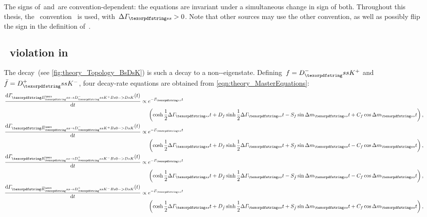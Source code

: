 The signs of~\Dpar and~\DG are convention-dependent: the equations are invariant under a simultaneous change in sign of both.
Throughout this thesis, the \hflav~convention~\cite{HFLAV2016} is used, with~\({\DGs > 0}\).
Note that other sources may use the other convention, as well as possibly flip the sign in the definition of~\Spar.

\subsection{\CP~violation in~\BsDsK}
\label{sec:CPV}

The decay~\BsDsK (see \cref{fig:theory_Topology_BsDsK}) is such a decay to a non-\CP-eigenstate. Defining~\({\f = \DsmKp}\) and~\({\fb = \DspKm}\), four decay-rate equations are obtained from \cref{eqn:theory_MasterEquations}:
%
\begin{subequations} \label{eqn:theory_MasterEquationsDsK}
    \begin{align}
        \begin{split}
            \dfrac{\deriv\Gamma_{\BsDsmKp}(t)} {\deriv t} \propto{} & e^{-\Gs t} \\
                & \left(\cosh \frac{1}{2} \DGs t + \Dpar \sinh \frac{1}{2} \DGs t - \Spar \sin \dms t + \Cpar \cos \dms t \right) \rlap{,}
        \end{split} \\
        \begin{split}
            \dfrac{\deriv\Gamma_{\BsbDsmKp}(t)}{\deriv t} \propto{} & e^{-\Gs t} \\
                & \left(\cosh \frac{1}{2} \DGs t + \Dpar \sinh \frac{1}{2} \DGs t + \Spar \sin \dms t - \Cpar \cos \dms t \right) \rlap{,}
        \end{split} \\
        \begin{split}
            \dfrac{\deriv\Gamma_{\BsDspKm}(t)} {\deriv t} \propto{} & e^{-\Gs t} \\
                & \left(\cosh \frac{1}{2} \DGs t + \Dbpar \sinh \frac{1}{2} \DGs t - \Sbpar \sin \dms t - \Cpar \cos \dms t \right) \rlap{,}
        \end{split} \\
        \begin{split}
            \dfrac{\deriv\Gamma_{\BsbDspKm}(t)}{\deriv t} \propto{} & e^{-\Gs t} \\
                & \left(\cosh \frac{1}{2} \DGs t + \Dbpar \sinh \frac{1}{2} \DGs t + \Sbpar \sin \dms t + \Cpar \cos \dms t \right) \rlap{,}
        \end{split}
    \end{align}
\end{subequations}
